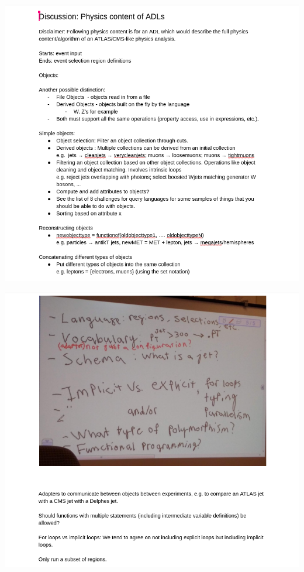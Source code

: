 \documentclass[aspectratio=169]{beamer}
\begin{document}
\begin{frame}{}
\vspace{-0.4 cm}
\begin{center}
\includegraphics[height=9.3 cm]{slides-16.png}
\end{center}
\end{frame}

\begin{frame}{}
\vspace{-0.3 cm}
\begin{center}
\includegraphics[height=9.1 cm]{slides-17.png}
\end{center}
\end{frame}
\end{document}
